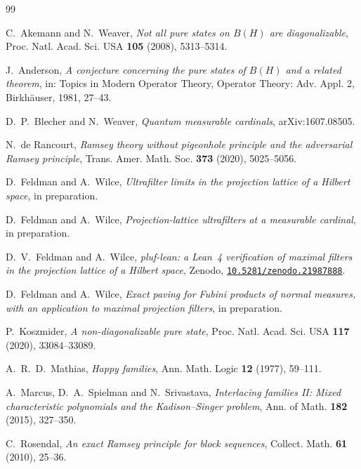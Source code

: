 \documentclass[11pt,reqno]{amsart}
\theoremstyle{definition}
\begin{document}
\begin{thebibliography}{99}

 C.~Akemann and N.~Weaver, \emph{Not all pure states on $B(H)$ are
diagonalizable}, Proc. Natl. Acad. Sci. USA \textbf{105} (2008), 5313--5314.

 J.~Anderson, \emph{A conjecture concerning the pure states of
$B(H)$ and a related theorem}, in: Topics in Modern Operator Theory, Operator Theory:
Adv. Appl. 2, Birkh\"auser, 1981, 27--43.

 D.~P.~Blecher and N.~Weaver, \emph{Quantum measurable
cardinals}, arXiv:1607.08505.

 N.~de Rancourt, \emph{Ramsey theory without pigeonhole principle
and the adversarial Ramsey principle}, Trans. Amer. Math. Soc. \textbf{373} (2020),
5025--5056.

 D.~Feldman and A.~Wilce, \emph{Ultrafilter limits in the projection
lattice of a Hilbert space}, in preparation.

 D.~Feldman and A.~Wilce, \emph{Projection-lattice ultrafilters at a
measurable cardinal}, in preparation.

 D.~V.~Feldman and A.~Wilce, \emph{pluf-lean: a Lean~4 verification of maximal filters in the projection lattice of a Hilbert space}, Zenodo, \href{https://doi.org/10.5281/zenodo.21987888}{\texttt{10.5281/zenodo.21987888}}.

 D.~Feldman and A.~Wilce, \emph{Exact paving for Fubini products of
normal measures, with an application to maximal projection filters}, in preparation.

 P.~Koszmider, \emph{A non-diagonalizable pure state}, Proc. Natl.
Acad. Sci. USA \textbf{117} (2020), 33084--33089.

 A.~R.~D.~Mathias, \emph{Happy families}, Ann. Math. Logic \textbf{12}
(1977), 59--111.

 A.~Marcus, D.~A.~Spielman and N.~Srivastava, \emph{Interlacing families
II: Mixed characteristic polynomials and the Kadison--Singer problem}, Ann. of Math.
\textbf{182} (2015), 327--350.

 C.~Rosendal, \emph{An exact Ramsey principle for block sequences},
Collect. Math. \textbf{61} (2010), 25--36.

\end{thebibliography}
\end{document}
